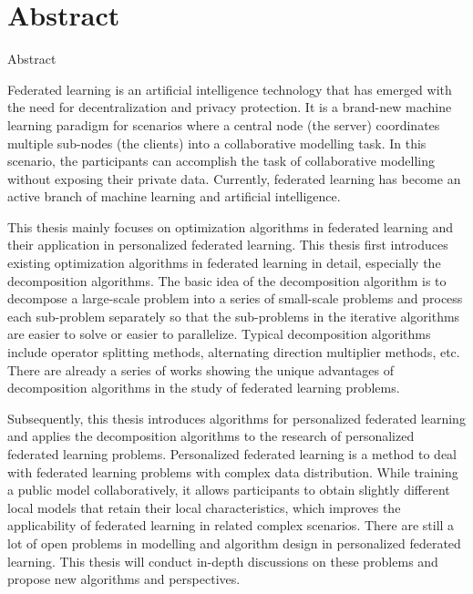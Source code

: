 \chapter*{{Abstract}}%
 \headheight=15.24pt%
 {Abstract}
 \headheight=15.24pt%
\setcounter{page}{2}


Federated learning is an artificial intelligence technology that has emerged with the need for decentralization and privacy protection. It is a brand-new machine learning paradigm for scenarios where a central node (the server) coordinates multiple sub-nodes (the clients) into a collaborative modelling task. In this scenario, the participants can accomplish the task of collaborative modelling without exposing their private data. Currently, federated learning has become an active branch of machine learning and artificial intelligence.

This thesis mainly focuses on optimization algorithms in federated learning and their application in personalized federated learning. This thesis first introduces existing optimization algorithms in federated learning in detail, especially the decomposition algorithms. The basic idea of the decomposition algorithm is to decompose a large-scale problem into a series of small-scale problems and process each sub-problem separately so that the sub-problems in the iterative algorithms are easier to solve or easier to parallelize. Typical decomposition algorithms include operator splitting methods, alternating direction multiplier methods, etc. There are already a series of works showing the unique advantages of decomposition algorithms in the study of federated learning problems.

Subsequently, this thesis introduces algorithms for personalized federated learning and applies the decomposition algorithms to the research of personalized federated learning problems. Personalized federated learning is a method to deal with federated learning problems with complex data distribution. While training a public model collaboratively, it allows participants to obtain slightly different local models that retain their local characteristics, which improves the applicability of federated learning in related complex scenarios. There are still a lot of open problems in modelling and algorithm design in personalized federated learning. This thesis will conduct in-depth discussions on these problems and propose new algorithms and perspectives.

